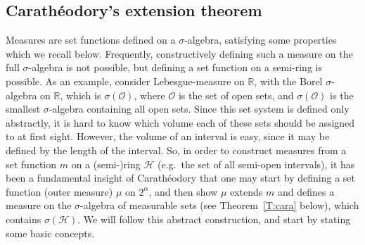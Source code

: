 \documentclass[lean]{DraftAFM}
\begin{document}

\noindent
\subsection{Carathéodory's extension theorem}
Measures are set functions defined on a $\sigma$-algebra, satisfying
some properties which we recall below. Frequently,
constructively defining such a measure on the full $\sigma$-algebra
is not possible, but defining a set function on a semi-ring is
possible. As an example, consider Lebesgue-measure on $\mathbb R$,
with the Borel $\sigma$-algebra on $\mathbb R$, which is
$\sigma(\mathcal O)$, where $\mathcal O$ is the set of open sets, and
$\sigma(\mathcal O)$ is the smallest $\sigma$-algebra containing all
open sets. Since this set system is defined only abstractly, it is
hard to know which volume each of these sets should be assigned to at
first sight. However, the volume of an interval is easy, since it may
be defined by the length of the interval. So, in order to construct
measures from a set function $m$ on a (semi-)ring $\mathcal H$
(e.g.\ the set of all semi-open intervals), it has been a fundamental
insight of Carathéodory that one may start by defining a set function
(outer measure) $\mu$ on $2^\alpha$, and then show $\mu$ extends $m$
and defines a measure on the $\sigma$-algebra of
  measurable sets (see Theorem~\ref{T:cara} below), which contains
$\sigma(\mathcal H)$.
We will follow this abstract construction, and start by stating some
basic concepts.
\end{document}
